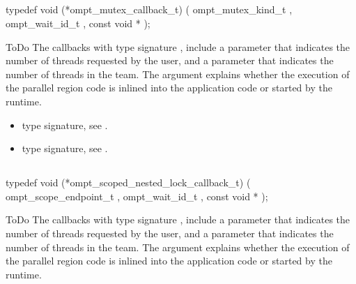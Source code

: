 \subsection{}
\label{subsec:ompt_mutex_callback_t}
\format
\begin{boxedcode}
typedef void (*ompt\_mutex\_callback\_t) (
  ompt\_mutex\_kind\_t ,
  ompt\_wait\_id\_t ,
  const void *
);
\end{boxedcode}
\descr ToDo
The callbacks with type signature ,
include a parameter 
that indicates the number of threads requested by the user, and a parameter
 that indicates the number of threads in the team.
The  argument explains whether the execution of the parallel
region code is inlined into the application code or started by the runtime.

\crossreferences
\begin{itemize}
\item {} type signature, see
.
\item {} type signature, see
.
\end{itemize}



\subsection{}
\label{subsec:ompt_scoped_nested_lock_callback_t}
\format
\begin{boxedcode}
typedef void (*ompt\_scoped\_nested\_lock\_callback\_t) (
  ompt\_scope\_endpoint\_t ,
  ompt\_wait\_id\_t ,
  const void *
);
\end{boxedcode}
\descr ToDo
The callbacks with type signature ,
include a parameter 
that indicates the number of threads requested by the user, and a parameter
 that indicates the number of threads in the team.
The  argument explains whether the execution of the parallel
region code is inlined into the application code or started by the runtime.

